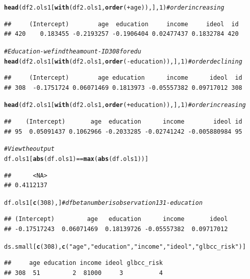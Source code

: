\documentclass[11pt,openany]{book}\usepackage[]{graphicx}\usepackage[]{color}
\makeatletter
\newcommand{\hlnum}[1]{\textcolor[rgb]{0.686,0.059,0.569}{#1}}%
\newcommand{\hlstr}[1]{\textcolor[rgb]{0.192,0.494,0.8}{#1}}%
\newcommand{\hlcom}[1]{\textcolor[rgb]{0.678,0.584,0.686}{\textit{#1}}}%
\newcommand{\hlopt}[1]{\textcolor[rgb]{0,0,0}{#1}}%
\newcommand{\hlstd}[1]{\textcolor[rgb]{0.345,0.345,0.345}{#1}}%
\newcommand{\hlkwd}[1]{\textcolor[rgb]{0.737,0.353,0.396}{\textbf{#1}}}%
\newenvironment{kframe}{%
 \def\at@end@of@kframe{}%
 \ifinner\ifhmode%
  \def\at@end@of@kframe{\end{minipage}}%
  \begin{minipage}{\columnwidth}%
 \fi\fi%
 \def\FrameCommand##1{\hskip\@totalleftmargin \hskip-\fboxsep
 \colorbox{shadecolor}{##1}\hskip-\fboxsep
     \hskip-\linewidth \hskip-\@totalleftmargin \hskip\columnwidth}%
 \MakeFramed {\advance\hsize-\width
   \@totalleftmargin\z@ \linewidth\hsize
   \@setminipage}}%
 {\par\unskip\endMakeFramed%
 \at@end@of@kframe}
\newenvironment{knitrout}{}{} %
\renewenvironment{knitrout}{\begin{singlespace}}{\end{singlespace}} %
\makeatother
\begin{document}
\begin{knitrout}
\begin{kframe}
\begin{alltt}
\hlkwd{head}\hlstd{(df2.ols1[}\hlkwd{with}\hlstd{(df2.ols1,} \hlkwd{order}\hlstd{(}\hlopt{+}\hlstd{age)), ],} \hlnum{1}\hlstd{)}  \hlcom{# order increasing}
\end{alltt}
\begin{verbatim}
##     (Intercept)        age  education     income     ideol  id
## 420    0.183455 -0.2193257 -0.1906404 0.02477437 0.1832784 420
\end{verbatim}
\begin{alltt}
\hlcom{# Education - we find the amount - ID 308 for edu}
\hlkwd{head}\hlstd{(df2.ols1[}\hlkwd{with}\hlstd{(df2.ols1,} \hlkwd{order}\hlstd{(}\hlopt{-}\hlstd{education)), ],} \hlnum{1}\hlstd{)}  \hlcom{# order declining}
\end{alltt}
\begin{verbatim}
##     (Intercept)        age education      income      ideol  id
## 308  -0.1751724 0.06071469 0.1813973 -0.05557382 0.09717012 308
\end{verbatim}
\begin{alltt}
\hlkwd{head}\hlstd{(df2.ols1[}\hlkwd{with}\hlstd{(df2.ols1,} \hlkwd{order}\hlstd{(}\hlopt{+}\hlstd{education)), ],} \hlnum{1}\hlstd{)}  \hlcom{# order increasing}
\end{alltt}
\begin{verbatim}
##    (Intercept)       age  education      income        ideol id
## 95  0.05091437 0.1062966 -0.2033285 -0.02741242 -0.005880984 95
\end{verbatim}
\begin{alltt}
\hlcom{# View the output}
\hlstd{df.ols1[}\hlkwd{abs}\hlstd{(df.ols1)} \hlopt{==} \hlkwd{max}\hlstd{(}\hlkwd{abs}\hlstd{(df.ols1))]}
\end{alltt}
\begin{verbatim}
##      <NA> 
## 0.4112137
\end{verbatim}
\begin{alltt}
\hlstd{df.ols1[}\hlkwd{c}\hlstd{(}\hlnum{308}\hlstd{), ]}  \hlcom{# dfbeta number is observation 131 - education}
\end{alltt}
\begin{verbatim}
## (Intercept)         age   education      income       ideol 
## -0.17517243  0.06071469  0.18139726 -0.05557382  0.09717012
\end{verbatim}
\begin{alltt}
\hlstd{ds.small[}\hlkwd{c}\hlstd{(}\hlnum{308}\hlstd{),} \hlkwd{c}\hlstd{(}\hlstr{"age"}\hlstd{,} \hlstr{"education"}\hlstd{,} \hlstr{"income"}\hlstd{,} \hlstr{"ideol"}\hlstd{,} \hlstr{"glbcc_risk"}\hlstd{)]}
\end{alltt}
\begin{verbatim}
##     age education income ideol glbcc_risk
## 308  51         2  81000     3          4
\end{verbatim}
\end{kframe}
\end{knitrout}
\end{document}
